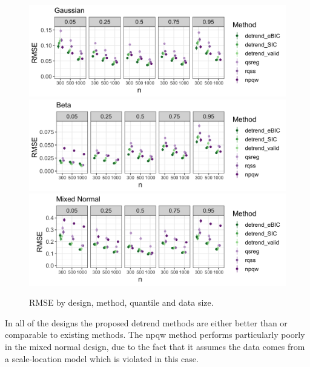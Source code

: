 \documentclass[12pt]{article}
\begin{document}
	\begin{figure}
		\caption{RMSE by design, method, quantile and data size.}
		\includegraphics[width=\linewidth]{Figures/gaus_mse.png}	
		\includegraphics[width=\linewidth]{Figures/shapebeta_mse.png}
		\includegraphics[width=\linewidth]{Figures/mixednorm_mse.png}
	\end{figure}
	In all of the designs the proposed detrend methods are either better than or comparable to existing methods. The npqw method performs particularly poorly in the mixed normal design, due to the fact that it assumes the data comes from a scale-location model which is violated in this case. 
	
\end{document}
